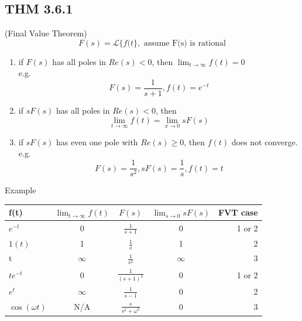 \documentclass[letterpaper]{article}
\begin{document}
\subsection*{THM 3.6.1} (Final Value Theorem)
$$F(s)=\mathscr{L}\{f(t\}, \text{ assume F(s) is rational}$$
\begin{enumerate}
	\item if $F(s)$ has all poles in $Re(s)<0$, then $\lim_{t\rightarrow \infty} f(t)=0$\\
	      e.g. $$F(s)=\frac{1}{s+1},f(t)=e^{-t}$$ 
	\item if $sF(s)$ has all poles in $Re(s) < 0$, then $$\lim_{t\rightarrow \infty}f(t)=\lim_{x\rightarrow 0} sF(s)$$
	\item if $sF(s)$ has even one pole with $Re(s) \geq 0$, then $f(t)$ does not converge.\\ e.g. $$F(s)=\frac{1}{s^2}, sF(s)=\frac{1}{s},f(t)=t$$
\end{enumerate}
Example\\
\begin{center}
	\begin{tabular}{ l | c | c | c | r }
		\hline
		f(t)            & $\lim_{t\rightarrow \infty} f(t)$ & $F(s)$                   & $\lim_{s\rightarrow 0}sF(s)$ & FVT case \\ \hline
		$e^{-t}$        & 0                                 & $\frac{1}{s+1}$          & 0                            & 1 or 2   \\ \hline
		$1(t)$          & 1                                 & $\frac{1}{s}$            & 1                            & 2        \\ \hline 
		t               & $\infty$                          & $\frac{1}{s^2}$          & $\infty$                     & 3        \\ \hline 
		$te^{-t}$       & 0                                 & $\frac{1}{(s+1)^2}$      & 0                            & 1 or 2   \\ \hline 
		$e^t$           & $\infty$                          & $\frac{1}{s-1}$          & 0                            & 2        \\ \hline 
		$\cos(\omega t)$ & N/A                               & $\frac{s}{s^2+\omega^2}$ & 0                            & 3        \\ 
		\hline
	\end{tabular}
\end{center}
\end{document}

